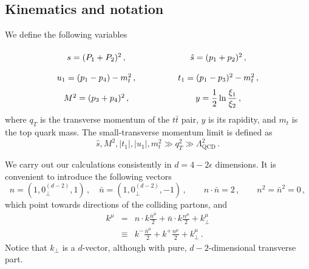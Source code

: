 \documentclass[a4paper,11pt]{article}
\newcommand{\shat}{{\hat s}}
\newcommand{\ttbar}{\ensuremath{t \bar t}\xspace}
\newcommand{\qcd}{\text{QCD}}
\newcommand{\nbar}{\ensuremath{\bar{n}}}
\numberwithin{equation}{section}
\begin{document}
\subsection{Kinematics and notation}
\label{sec:kinematics}
We define the following variables
%
\begin{equation}
  {\renewcommand{\arraystretch}{2.0}%
  \begin{array}{ccc}
  s = (P_1 + P_2)^2\,,   &\hspace{30pt} & \hat s = (p_1 + p_2)^2\,, \\
  u_1 = (p_1-p_4) - m_t^2\,,&\hspace{30pt} & t_1 = (p_1-p_3)^2 - m_t^2\,,\\
  M^2 = (p_3 + p_4)^2\,, &\hspace{30pt} &  
  y = \displaystyle \frac12 \ln\frac{\xi_1}{\xi_2}\,,
  \label{eq:kin-var}
  \end{array}
  }
\end{equation}
%
where $q_T$ is the transverse momentum of the \ttbar pair, $y$ is its rapidity,
and $m_t$ is the top quark mass.
%
The small-transverse momentum limit is defined as
%
\begin{equation}
  \shat, M^2, |t_1|, |u_1|, m_t^2 \gg q_T^2 \gg \Lambda^2_\qcd\,.
\end{equation}

We carry out our calculations consistently in $d = 4 -2 \epsilon$ dimensions.
%
It is convenient to introduce the following vectors
%
\begin{equation}
  n = (1,0_\perp^{(d-2)},1)\,,\quad 
  \nbar = (1,0_\perp^{(d-2)},-1)\,, \qquad n\cdot \nbar = 2\,,
  \qquad n^2 = \nbar^2 = 0\,,
  \label{eq:nnbar-defs}
\end{equation}
%
which point towards directions of the colliding partons, and
%
\begin{eqnarray}
  k^\mu 
  & =  &
  n\cdot k \frac{\nbar^\mu}{2} + \nbar \cdot k \frac{n^\mu}{2} + 
  k_\perp^\mu \\
  & \equiv & 
  k^- \frac{\nbar^\mu}{2} +  k^+ \frac{n^\mu}{2} + k_\perp^\mu\,.
\end{eqnarray}
%
Notice that $k_\perp$ is a $d$-vector, although with pure, $d-2$-dimensional
transverse part.
\end{document}
